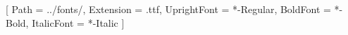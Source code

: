 \usepackage{geometry}         %
\geometry{margin=30mm}

\usepackage{fontspec}
\setmainfont{Cormorant Garamond}[
  Path = ../fonts/,
  Extension = .ttf,
  UprightFont = *-Regular,
  BoldFont = *-Bold,
  ItalicFont = *-Italic
]
\usepackage{microtype}

\usepackage{titling}

\setlength{\droptitle}{0.2\textheight}

\makeatletter
\renewcommand*{\maketitle}{%
  \newgeometry{top=50mm,bottom=40mm,left=35mm,right=35mm}

  \begin{titlepage}
    \begingroup
      \centering
      \vspace*{\droptitle}

      {\fontsize{44pt}{50pt}\selectfont\bfseries \thetitle\par}

      \vspace{1em}

      {\fontsize{32pt}{38pt}\selectfont \thedate\par}

      \vspace{2em}

      {\fontsize{28pt}{32pt}\selectfont \theauthor\par}

      \thispagestyle{empty}
    \endgroup
  \end{titlepage}%
  \restoregeometry
}
\makeatother
